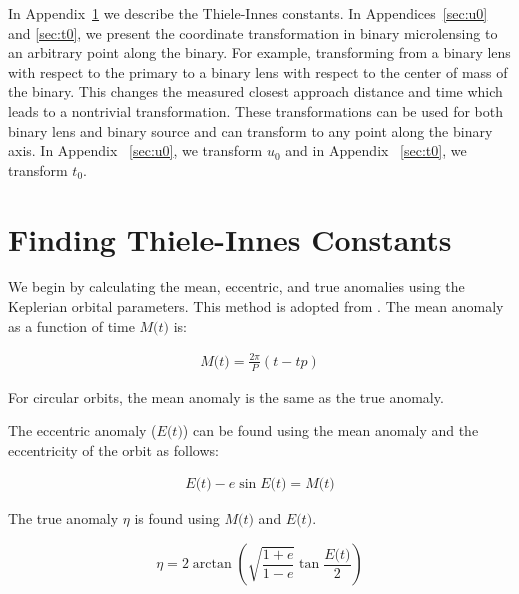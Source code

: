 \documentclass[twocolumn]{aastex701}
\newcommand{\w}{\omega_{pri}}
\newcommand{\eccentricity}{\textit{e}}
\newcommand{\period}{\textit{P}}
\newcommand{\E}{\textit{E(t)}}
\newcommand{\M}{\textit{M(t)}}
\newcommand{\etanom}{\eta}
\begin{document}
\appendix
In Appendix~\ref{sec:Thiele-Innes} we describe the Thiele-Innes constants. In Appendices~\ref{sec:u0} and \ref{sec:t0}, we present the coordinate transformation in binary microlensing to an arbitrary point along the binary. For example, transforming from a binary lens with respect to the primary to a binary lens with respect to the center of mass of the binary. This changes the measured closest approach distance and time which leads to a nontrivial transformation. These transformations can be used for both binary lens and binary source and can transform to any point along the binary axis. In Appendix ~\ref{sec:u0}, we transform $u_0$ and in Appendix ~\ref{sec:t0}, we transform $t_0$.


\section{Finding Thiele-Innes Constants}
\label{sec:Thiele-Innes}
We begin by calculating the mean, eccentric, and true anomalies using the Keplerian orbital parameters. This method is adopted from \citet{Koren_2016}. The mean anomaly as a function of time $\M$ is:

\begin{eqnarray}
    \label{mean_anomaly}
    \M = \frac{2 \pi}{\period} (t-tp)
\end{eqnarray}

For circular orbits, the mean anomaly is the same as the true anomaly. 

The eccentric anomaly ($\E$) can be found using the mean anomaly and the eccentricity of the orbit as follows:
 
\begin{eqnarray}
    \label{ecc_anomaly}
    \E - \eccentricity \sin \E = \M
\end{eqnarray}

The true anomaly $\etanom$ is found using $\M$ and $\E$. 


\begin{equation}
    \label{true_anomaly}
    \etanom = 2 \arctan \left( \sqrt{\frac{1+\eccentricity}{1-\eccentricity}} \tan{\frac{\E}{2}} \right)
\end{equation}
\end{document}
